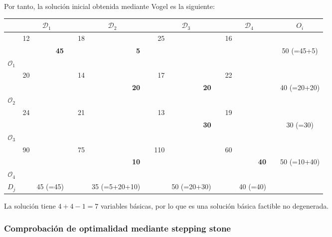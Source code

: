 Por tanto, la solución inicial obtenida mediante Vogel es la siguiente:

\begin{center}
\begin{tabular}{c|rrr|rrr|rrr|rrr|c}
& \multicolumn{3}{c|}{$\mathcal{D}_1$} 
& \multicolumn{3}{c|}{$\mathcal{D}_2$} 
& \multicolumn{3}{c|}{$\mathcal{D}_3$} 
& \multicolumn{3}{c|}{$\mathcal{D}_4$} 
& $O_i$ \\

\hline
& \footnotesize{12} &&& \footnotesize{18} &&& \footnotesize{25} &&& \footnotesize{16} &&& \\
&& \textbf{45} &&& \textbf{5} &&& &&& && 50 \tiny{(=45+5)} \\
\multirow{-3}{*}{$\mathcal{O}_1$} &&&&&&&&&&&&& \\

\hline
& \footnotesize{20} &&& \footnotesize{14} &&& \footnotesize{17} &&& \footnotesize{22} &&& \\
&& &&& \textbf{20} &&& \textbf{20} &&& && 40 \tiny{(=20+20)} \\
\multirow{-3}{*}{$\mathcal{O}_2$} &&&&&&&&&&&&& \\

\hline
& \footnotesize{24} &&& \footnotesize{21} &&& \footnotesize{13} &&& \footnotesize{19} &&& \\
&& &&& &&& \textbf{30} &&& && 30 \tiny{(=30)} \\
\multirow{-3}{*}{$\mathcal{O}_3$} &&&&&&&&&&&&& \\

\hline
& \footnotesize{90} &&& \footnotesize{75} &&& \footnotesize{110} &&& \footnotesize{60} &&& \\
&& &&& \textbf{10} &&& &&& \textbf{40} && 50 \tiny{(=10+40)} \\
\multirow{-3}{*}{$\mathcal{O}_4$} &&&&&&&&&&&&& \\

\hline
$D_j$ 
&& 45 \tiny{(=45)} &&
& 35 \tiny{(=5+20+10)} &&
& 50 \tiny{(=20+30)} &&
& 40 \tiny{(=40)} && \\
\end{tabular}
\end{center}

La solución tiene $4+4-1=7$ variables básicas, por lo que es una solución básica factible no degenerada.

\subsubsection*{Comprobación de optimalidad mediante stepping stone}

